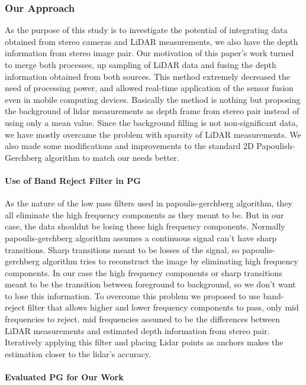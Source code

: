 \documentclass[conference]{IEEEtran}
\begin{document}
\subsubsection{Our Approach}
As the purpose of this study is to investigate the potential of integrating data obtained from stereo cameras and LiDAR measurements, we also have the depth information from stereo image pair. Our motivation of this paper's work turned to merge both processes, up sampling of LiDAR data and fusing the depth information obtained from both sources. This method extremely decreased the need of processing power, and allowed real-time application of the sensor fusion even in mobile computing devices.
Basically the method is nothing but proposing the background of lidar measurements as depth frame from stereo pair instead of using only a mean value. Since the background filling is not non-significant data, we have mostly overcame the problem with sparsity of LiDAR measurements.
We also made some modifications and improvements to the standard 2D Papoulish-Gerchberg algorithm to match our needs better.
\paragraph{Use of Band Reject Filter in PG}
As the nature of the low pass filters used in papoulis-gerchberg algorithm, they all eliminate the high frequency components as they meant to be. But in our case, the data shouldnt be losing these high frequency components. Normally papoulis-gerchberg algorithm assumes a continuous signal can't have sharp transitions. Sharp transitions meant to be losses of the signal, so papoulis-gerchberg algorithm tries to reconstruct the image by eliminating high frequency components.
In our case the high frequency components or sharp transitions meant to be the transition between foreground to background, so we don't want to lose this information.
To overcome this problem we proposed to use band-reject filter that allows higher and lower frequency components to pass, only mid frequencies to reject. mid frequencies assumed to be the differences between LiDAR measurements and estimated depth information from stereo pair. Iteratively applying this filter and placing Lidar points as anchors makes the estimation closer to the lidar's accuracy.


\paragraph{Evaluated PG for Our Work}
\end{document}
